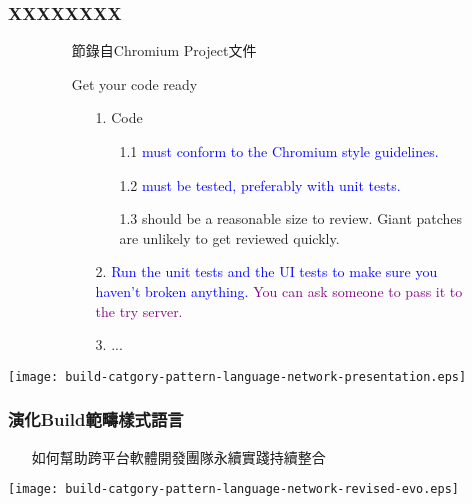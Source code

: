 \documentclass[utf8x]{beamer}
\begin{document}
\begin{frame}%
\frametitle{XXXXXXXX}
\begin{figure}
\begin{itemize}
\setlength{\itemindent}{1em}
\fontsize{8pt}{8pt}\selectfont
\item[] 節錄自Chromium Project文件
\item[] Get your code ready
\begin{itemize}
\fontsize{8pt}{8pt}\selectfont
\setlength{\itemindent}{1em}
\item[1.]  Code
\begin{itemize}
\fontsize{8pt}{8pt}\selectfont
\item[1.1] \textcolor{blue}{must conform to the Chromium style guidelines.}
\item[1.2] \textcolor{blue}{must be tested, preferably with unit tests.}
\item[1.3] should be a reasonable size to review. Giant patches are unlikely to get reviewed quickly.
\end{itemize}
\item[2.] \textcolor{blue}{Run the unit tests and the UI tests to make sure you haven't broken anything.} \textcolor{purple}{You can ask someone to pass it to the try server.}
\item[3.] ...
\end{itemize}
\end{itemize}
\end{figure}
\begin{center}
\texttt{[image: build-catgory-pattern-language-network-presentation.eps]}
\end{center}
\end{frame}

\begin{frame}%
\frametitle{演化Build範疇樣式語言}
\begin{itemize}
\setlength{\itemindent}{1em}
\item[] 如何幫助跨平台軟體開發團隊永續實踐持續整合
\end{itemize}
\texttt{[image: build-catgory-pattern-language-network-revised-evo.eps]}
\end{frame}
\end{document}
